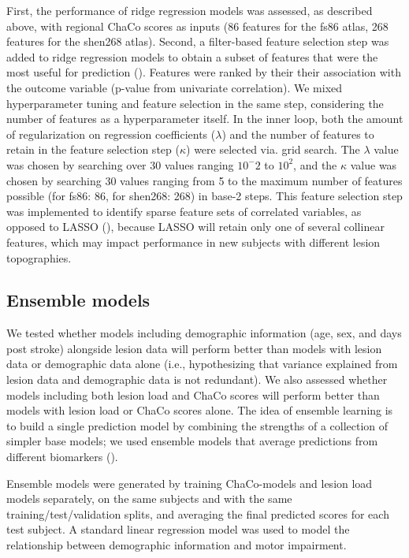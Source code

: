 \documentclass[phd,tocprelim]{cornell}
\begin{document}
First, the performance of ridge regression models was assessed, as described above, with regional ChaCo scores as inputs (86 features for the fs86 atlas, 268 features for the shen268 atlas). Second, a filter-based feature selection step was added to ridge regression models to obtain a subset of features that were the most useful for prediction (\cite{Guyon2003-kj, Hall1999-qr, Pudjihartono2022-zg}). Features were ranked by their their association with the outcome variable (p-value from univariate correlation). We mixed hyperparameter tuning and feature selection in the same step, considering the number of features as a hyperparameter itself.  In the inner loop, both the amount of regularization on regression coefficients ($\lambda$) and the number of features to retain in the feature selection step ($\kappa$) were selected via. grid search. The $\lambda$ value was chosen by searching over 30 values ranging $10^-2$ to $10^2$, and the $\kappa$ value was chosen by searching 30 values ranging from 5 to the maximum number of features possible (for fs86: 86, for shen268: 268) in base-2 steps.  This feature selection step was implemented to identify sparse feature sets of correlated variables, as opposed to LASSO (\cite{Tibshirani1996-sk}), because LASSO will retain only one of several collinear features, which may impact performance in new subjects with different lesion topographies. 

\subsection{Ensemble models}

We tested whether models including demographic information (age, sex, and days post stroke) alongside lesion data will perform better than models with lesion data or demographic data alone (i.e., hypothesizing that variance explained from lesion data and demographic data is not redundant). We also assessed whether models including both lesion load and ChaCo scores will perform better than models with lesion load or ChaCo scores alone. The idea of ensemble learning is to build a single prediction model by combining the strengths of a collection of simpler base models; we used ensemble models that average predictions from different biomarkers (\cite{Hastie2001-or}).

Ensemble models were generated by training ChaCo-models and lesion load models separately, on the same subjects and with the same training/test/validation splits, and averaging the final predicted scores for each test subject. A standard linear regression model was used to model the relationship between demographic information and motor impairment. 
\end{document}
